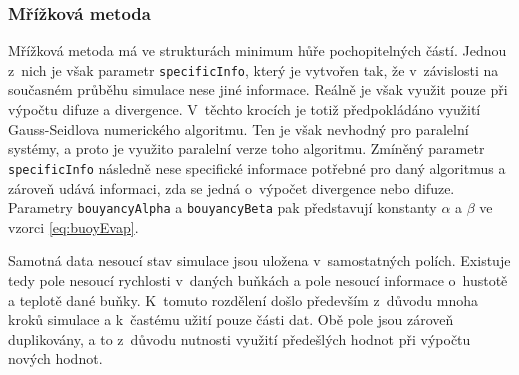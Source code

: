\begin{figure}[h]
	\label{fig:structsSPH}
\end{figure}

\subsubsection{Mřížková metoda}
Mřížková metoda má ve strukturách minimum hůře pochopitelných částí. Jednou z~nich je však parametr \texttt{specificInfo}, který je vytvořen tak, že v~závislosti na současném průběhu simulace nese jiné informace. Reálně je však využit pouze při výpočtu difuze a divergence. V~těchto krocích je totiž předpokládáno využití Gauss-Seidlova numerického algoritmu. Ten je však nevhodný pro paralelní systémy, a proto je využito paralelní verze toho algoritmu. Zmíněný parametr \texttt{specificInfo} následně nese specifické informace potřebné pro daný algoritmus a zároveň udává informaci, zda se jedná o~výpočet divergence nebo difuze. Parametry \texttt{bouyancyAlpha} a \texttt{bouyancyBeta} pak představují konstanty $\alpha$ a $\beta$ ve vzorci \ref{eq:buoyEvap}.

Samotná data nesoucí stav simulace jsou uložena v~samostatných polích. Existuje tedy pole nesoucí rychlosti v~daných buňkách a pole nesoucí informace o~hustotě a teplotě dané buňky. K~tomuto rozdělení došlo především z~důvodu mnoha kroků simulace a k~častému užití pouze části dat. Obě pole jsou zároveň duplikovány, a to z~důvodu nutnosti využití předešlých hodnot při výpočtu nových hodnot. 

